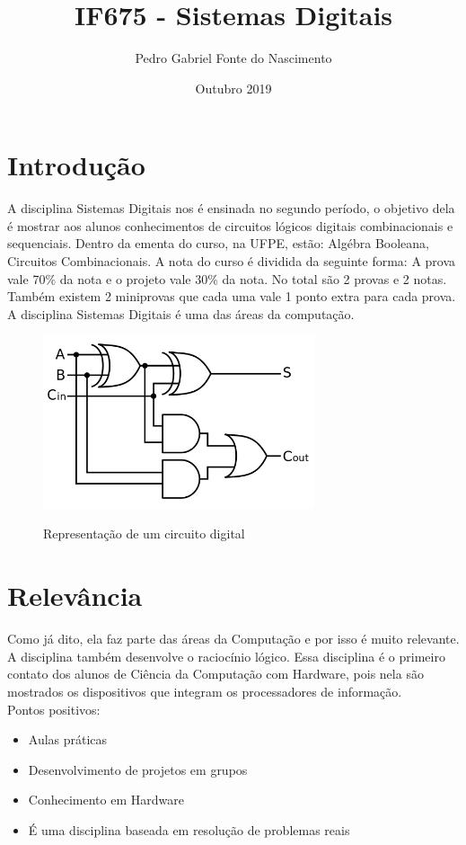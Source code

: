 \documentclass[10pt]{article}
\title{IF675 - Sistemas Digitais}
\author{Pedro Gabriel Fonte do Nascimento}
\date{Outubro 2019}
\begin{document}
\maketitle

\section{Introdução}
A disciplina Sistemas Digitais nos é ensinada no segundo período, o objetivo dela é mostrar aos alunos conhecimentos de circuitos lógicos digitais combinacionais e sequenciais. Dentro da ementa do curso, na UFPE, estão: Algébra Booleana, Circuitos Combinacionais. A nota do curso é dividida da seguinte forma: A prova vale 70\% da nota e o projeto vale 30\% da nota. No total são 2 provas e 2 notas. Também existem 2 miniprovas que cada uma vale 1 ponto extra para cada prova. A disciplina Sistemas Digitais é uma das áreas da computação.   %

\begin{figure}[h]
    \centering
\includegraphics[width=8cm]{adder.png}
    \label{fig:my_label}
    \caption{Representação de um circuito digital \cite{imagem}}
    
    
\end{figure}
\section{Relevância}
Como já dito, ela faz parte das áreas da Computação e por isso é muito relevante. A disciplina também desenvolve o raciocínio lógico. Essa disciplina é o primeiro contato dos alunos de Ciência da Computação com Hardware, pois nela são mostrados os dispositivos que integram os processadores de informação.\\


Pontos positivos:
\begin{itemize}
    \item Aulas práticas
    \item Desenvolvimento de projetos em grupos
    \item Conhecimento em Hardware
    \item É uma disciplina baseada em resolução de problemas reais
\end{itemize}
\end{document}
